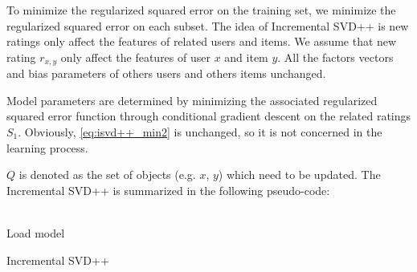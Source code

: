 \documentclass[oneside,13pt]{extreport}
\begin{document}
To minimize the regularized squared error on the training set, we minimize the regularized squared error on each subset. The idea of Incremental SVD++ is new ratings only affect the features of related users and items. We assume that new rating $r_{x,y}$ only affect the features of user $x$ and item $y$. All the factors vectors and bias parameters of others users and others items unchanged.  

Model parameters are determined by minimizing the associated regularized squared error function through conditional gradient descent on the related ratings $S_1$. Obviously, \ref{eq:isvd++_min2} is unchanged, so it is not concerned in the learning process. 

$Q$ is denoted as the set of objects (e.g. $x$, $y$) which need to be updated. The Incremental SVD++ is summarized in the following pseudo-code:
\\\\

\begin{algorithm}[H]
 Load model\;
 \caption{Incremental SVD++}
\end{algorithm}
\end{document}
